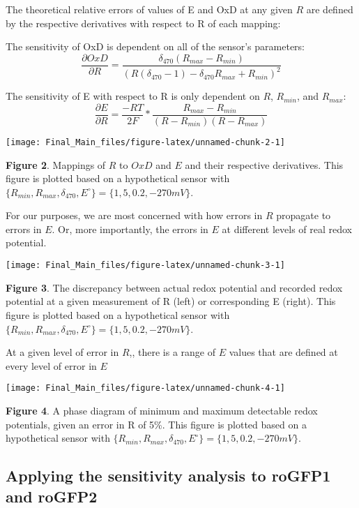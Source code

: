 \documentclass[]{article}
\begin{document}
The theoretical relative errors of values of E and OxD at any given
\(R\) are defined by the respective derivatives with respect to R of
each mapping:

The sensitivity of OxD is dependent on all of the sensor's parameters:
\[\frac{\partial OxD}{\partial R} = \frac{\delta_{470}(R_{max}-R_{min})}{(R(\delta_{470} - 1) - \delta_{470}R_{max} + R_{min})^2}\]

The sensitivity of E with respect to R is only dependent on \(R\),
\(R_{min}\), and \(R_{max}\):
\[\frac{\partial E}{\partial R} = \frac{-RT}{2F}*\frac{R_{max}-R_{min}}{(R-R_{min})(R-R_{max})}\]

\begin{center}\texttt{[image: Final\_Main\_files/figure-latex/unnamed-chunk-2-1]} \end{center}

\textbf{Figure 2}. Mappings of \(R\) to \(OxD\) and \(E\) and their
respective derivatives. This figure is plotted based on a hypothetical
sensor with
\(\{R_{min}, R_{max}, \delta_{470}, E^\circ\} = \{1, 5, 0.2, -270 mV\}\).

For our purposes, we are most concerned with how errors in \(R\)
propagate to errors in \(E\). Or, more importantly, the errors in \(E\)
at different levels of real redox potential.

\begin{center}\texttt{[image: Final\_Main\_files/figure-latex/unnamed-chunk-3-1]} \end{center}

\textbf{Figure 3}. The discrepancy between actual redox potential and
recorded redox potential at a given measurement of R (left) or
corresponding E (right). This figure is plotted based on a hypothetical
sensor with
\(\{R_{min}, R_{max}, \delta_{470}, E^\circ\} = \{1, 5, 0.2, -270 mV\}\).

At a given level of error in \(R\),, there is a range of \(E\) values
that are defined at every level of error in \(E\)

\begin{center}\texttt{[image: Final\_Main\_files/figure-latex/unnamed-chunk-4-1]} \end{center}

\textbf{Figure 4}. A phase diagram of minimum and maximum detectable
redox potentials, given an error in R of 5\%. This figure is plotted
based on a hypothetical sensor with
\(\{R_{min}, R_{max}, \delta_{470}, E^\circ\} = \{1, 5, 0.2, -270 mV\}\).

\subsection{Applying the sensitivity analysis to roGFP1 and
roGFP2}\label{applying-the-sensitivity-analysis-to-rogfp1-and-rogfp2}
\end{document}
